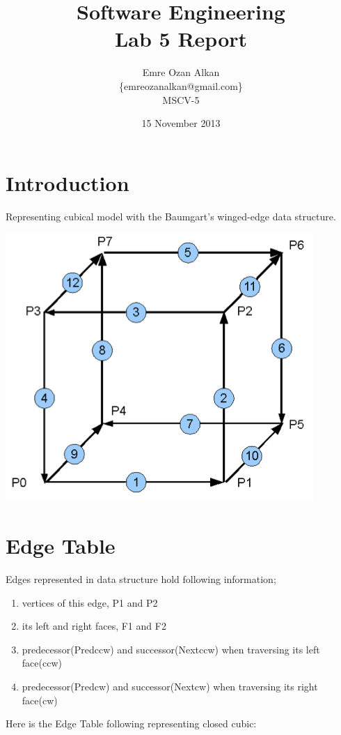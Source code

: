\documentclass{article}
\title{Software Engineering\\
		Lab 5 Report}
\author{Emre Ozan Alkan\\
		\{emreozanalkan@gmail.com\}\\
		MSCV-5}
\date{15 November 2013}
\begin{document}
\maketitle

\section{Introduction}
Representing cubical model with the Baumgart's winged-edge data structure.

\includegraphics{lab5Cubic.png}

\section{Edge Table}
Edges represented in data structure hold following information;
\begin{enumerate}
\item vertices of this edge, P1 and P2
\item its left and right faces, F1 and F2
\item predecessor(Predccw) and successor(Nextccw) when traversing its left face(ccw)
\item predecessor(Predcw) and successor(Nextcw) when traversing its right face(cw)
\end{enumerate}

Here is the Edge Table following representing closed cubic:
\end{document}

